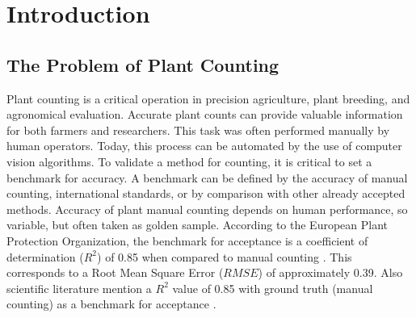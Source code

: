 \documentclass[journal,article,submit,pdftex,moreauthors]{Definitions/mdpi}
\begin{document}
\section{Introduction} 

\subsection{The Problem of Plant Counting}

Plant counting is a critical operation in precision agriculture, plant breeding, 
and agronomical evaluation. 
Accurate plant counts can provide valuable information for both farmers and researchers.
This task was often performed manually by human operators. 
Today, this process can be automated by the use of computer vision algorithms.
To validate a method for counting, it is critical to set a benchmark for accuracy. 
A benchmark can be defined by the accuracy of manual counting, international standards, 
or by comparison with other already accepted methods.
Accuracy of plant manual counting depends on human performance, so variable, but often taken as golden sample. 
According to the European Plant Protection Organization, the benchmark for acceptance is 
a coefficient of determination ($R^2$) of 0.85 when compared to manual counting \cite{PP13332024}.
This corresponds to a Root Mean Square Error ($RMSE$) of approximately 0.39.
Also scientific literature mention a $R^2$ value of 0.85 with ground truth (manual counting) 
as a benchmark for acceptance \cite{zouMaizeTasselsDetection2020}.
\end{document}
